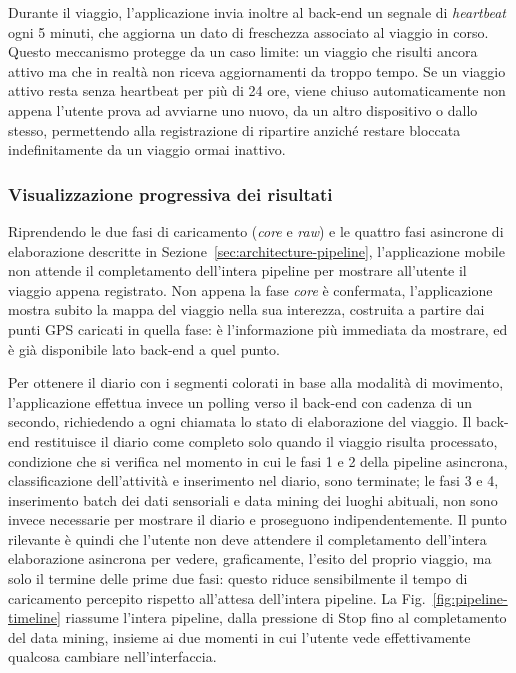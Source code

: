 \documentclass[conference]{IEEEtran}
\begin{document}
Durante il viaggio, l'applicazione invia inoltre al back-end un
segnale di \emph{heartbeat} ogni 5 minuti, che aggiorna un dato di
freschezza associato al viaggio in corso. Questo meccanismo protegge
da un caso limite: un viaggio che risulti ancora attivo ma che in
realtà non riceva aggiornamenti da troppo tempo.
Se un viaggio attivo resta senza heartbeat per più di 24 ore, viene chiuso
automaticamente non appena l'utente prova ad avviarne uno nuovo, da
un altro dispositivo o dallo stesso, permettendo alla registrazione
di ripartire anziché restare bloccata indefinitamente da un viaggio
ormai inattivo.

\subsubsection{Visualizzazione progressiva dei risultati}

Riprendendo le due fasi di caricamento (\emph{core} e \emph{raw}) e le
quattro fasi asincrone di elaborazione descritte in
Sezione~\ref{sec:architecture-pipeline}, l'applicazione mobile non
attende il completamento dell'intera pipeline per mostrare all'utente
il viaggio appena registrato. Non appena la fase \emph{core} è
confermata, l'applicazione mostra subito la mappa del viaggio nella
sua interezza, costruita a partire dai punti GPS caricati in quella
fase: è l'informazione più immediata da mostrare, ed è già disponibile
lato back-end a quel punto.

Per ottenere il diario con i segmenti colorati in base alla modalità
di movimento, l'applicazione effettua invece un polling verso il
back-end con cadenza di un secondo, richiedendo a ogni chiamata lo
stato di elaborazione del viaggio. Il back-end restituisce il diario
come completo solo quando il viaggio risulta processato, condizione
che si verifica nel momento in cui le fasi 1 e 2 della pipeline
asincrona, classificazione dell'attività e inserimento nel diario,
sono terminate; le fasi 3 e 4, inserimento batch dei dati
sensoriali e data mining dei luoghi abituali, non sono invece
necessarie per mostrare il diario e proseguono indipendentemente. Il
punto rilevante è quindi che l'utente non deve attendere il
completamento dell'intera elaborazione asincrona per vedere,
graficamente, l'esito del proprio viaggio, ma solo il termine delle
prime due fasi: questo riduce sensibilmente il tempo di caricamento
percepito rispetto all'attesa dell'intera pipeline. La
Fig.~\ref{fig:pipeline-timeline} riassume l'intera pipeline, dalla
pressione di Stop fino al completamento del data mining, insieme ai
due momenti in cui l'utente vede effettivamente qualcosa cambiare
nell'interfaccia.
\end{document}
